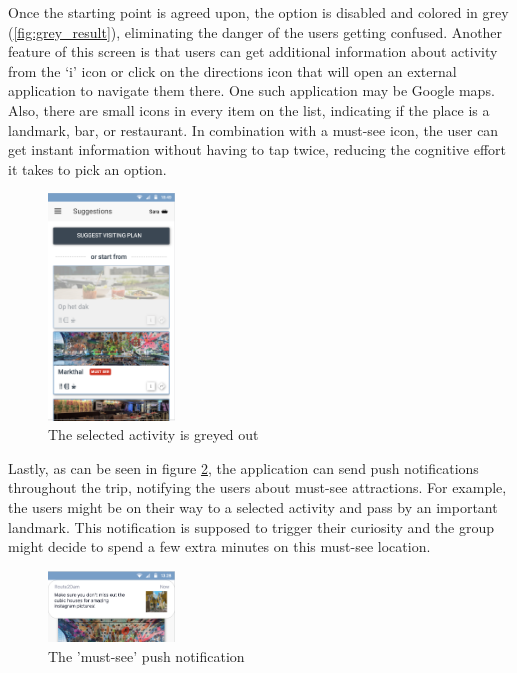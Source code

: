 \documentclass[11pt,a4paper,oneside]{article}
\begin{document}
Once the starting point is agreed upon, the option is disabled and colored in grey (\autoref{fig:grey_result}), eliminating the danger of the users getting confused. Another feature of this screen is that users can get additional information about activity from the ‘i’ icon or click on the directions icon that will open an external application to navigate them there. One such application may be Google maps. Also, there are small icons in every item on the list, indicating if the place is a landmark, bar, or restaurant. In combination with a must-see icon, the user can get instant information without having to tap twice, reducing the cognitive effort it takes to pick an option.

\begin{figure}[H]
    \centering
    \includegraphics[width=0.3\textwidth]{paper/imgs/hifi_prototypes/results_grey.png}
    \caption{The selected activity is greyed out}
    \label{fig:grey_result}
\end{figure}

Lastly, as can be seen in figure \ref{fig:must_see}, the application can send push notifications throughout the trip, notifying the users about must-see attractions. For example, the users might be on their way to a selected activity and pass by an important landmark. This notification is supposed to trigger their curiosity and the group might decide to spend a few extra minutes on this must-see location.

\begin{figure}[H]
    \centering
    \includegraphics[width=0.3\textwidth]{paper/imgs/hifi_prototypes/push_notification_must_see.png}
    \caption{The 'must-see' push notification}
    \label{fig:must_see}
\end{figure}
\end{document}
